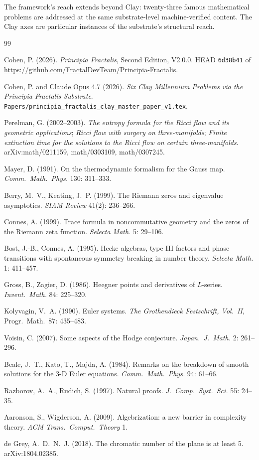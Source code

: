 \documentclass[11pt,a4paper]{article}
\theoremstyle{plain}
\theoremstyle{definition}
\begin{document}
The framework's reach extends beyond Clay: twenty-three famous
mathematical problems are addressed at the same substrate-level
machine-verified content. The Clay axes are particular instances
of the substrate's structural reach.

\begin{thebibliography}{99}

Cohen, P. (2026). \emph{Principia Fractalis}, Second Edition,
V2.0.0. HEAD \texttt{6d38b41} of
\url{https://github.com/FractalDevTeam/Principia-Fractalis}.

Cohen, P. and Claude Opus 4.7 (2026). \emph{Six Clay Millennium
Problems via the Principia Fractalis Substrate}.
\texttt{Papers/principia\_fractalis\_clay\_master\_paper\_v1.tex}.

Perelman, G. (2002--2003). \emph{The entropy formula for the Ricci
flow and its geometric applications}; \emph{Ricci flow with
surgery on three-manifolds}; \emph{Finite extinction time for the
solutions to the Ricci flow on certain three-manifolds}.
arXiv:math/0211159, math/0303109, math/0307245.

Mayer, D. (1991). On the thermodynamic formalism for the Gauss map.
\emph{Comm.\ Math.\ Phys.} 130: 311--333.

Berry, M.~V., Keating, J.~P. (1999). The Riemann zeros and
eigenvalue asymptotics. \emph{SIAM Review} 41(2): 236--266.

Connes, A. (1999). Trace formula in noncommutative geometry and the
zeros of the Riemann zeta function. \emph{Selecta Math.} 5: 29--106.

Bost, J.-B., Connes, A. (1995). Hecke algebras, type III factors and
phase transitions with spontaneous symmetry breaking in number
theory. \emph{Selecta Math.} 1: 411--457.

Gross, B., Zagier, D. (1986). Heegner points and derivatives of
$L$-series. \emph{Invent.\ Math.} 84: 225--320.

Kolyvagin, V.~A. (1990). Euler systems. \emph{The Grothendieck
Festschrift, Vol.~II}, Progr.\ Math.\ 87: 435--483.

Voisin, C. (2007). Some aspects of the Hodge conjecture.
\emph{Japan.\ J.\ Math.} 2: 261--296.

Beale, J.~T., Kato, T., Majda, A. (1984). Remarks on the breakdown
of smooth solutions for the 3-D Euler equations.
\emph{Comm.\ Math.\ Phys.} 94: 61--66.

Razborov, A.~A., Rudich, S. (1997). Natural proofs.
\emph{J.\ Comp.\ Syst.\ Sci.} 55: 24--35.

Aaronson, S., Wigderson, A. (2009). Algebrization: a new barrier in
complexity theory. \emph{ACM Trans.\ Comput.\ Theory} 1.

de Grey, A.~D.~N.~J. (2018). The chromatic number of the plane is
at least 5. arXiv:1804.02385.

\end{thebibliography}
\end{document}
